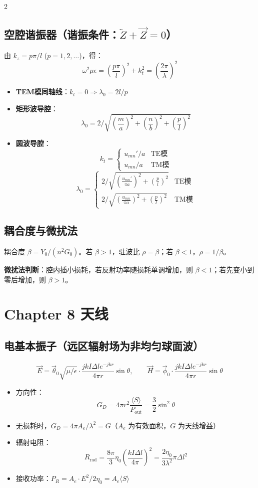 \documentclass[10pt,a4paper,landscape]{article}
\begin{document}
\begin{multicols}{2}
\subsection{空腔谐振器（谐振条件：$\overleftarrow{Z} + \overrightarrow{Z} = 0$）}
由 $k_z = p\pi/l$ ($p=1,2,\dots$)，得：
\[
\omega^2\mu\epsilon = \left(\frac{p\pi}{l}\right)^2 + k_t^2 = \left(\frac{2\pi}{\lambda}\right)^2
\]
\begin{itemize}
    \item \textbf{TEM模同轴线}：$k_t = 0 \Rightarrow \lambda_0 = 2l/p$
    \item \textbf{矩形波导腔}：
    \[
    \lambda_0 = 2 / \sqrt{\left(\frac{m}{a}\right)^2 + \left(\frac{n}{b}\right)^2 + \left(\frac{p}{l}\right)^2}
    \]
    \item \textbf{圆波导腔}：
    \[
    k_t = \begin{cases}
    u_{mn}'/a & \text{TE模} \\
    u_{mn}/a & \text{TM模}
    \end{cases}
    \]
    \[
    \lambda_0 = \begin{cases}
    2 / \sqrt{\left(\frac{u_{mn}'}{\pi a}\right)^2 + \left(\frac{p}{l}\right)^2} & \text{TE模} \\
    2 / \sqrt{\left(\frac{u_{mn}}{\pi a}\right)^2 + \left(\frac{p}{l}\right)^2} & \text{TM模}
    \end{cases}
    \]
\end{itemize}

\subsection{耦合度与微扰法}
耦合度 $\beta = Y_0/(n^2 G_0)$。若 $\beta>1$，驻波比 $\rho=\beta$；若 $\beta<1$，$\rho=1/\beta$。

\textbf{微扰法判断}：腔内插小损耗，若反射功率随损耗单调增加，则 $\beta<1$；若先变小到零后增加，则 $\beta>1$。

\section{Chapter 8 天线}
\subsection{电基本振子（远区辐射场为非均匀球面波）}
\[
\vec{E} = \vec{\theta}_0 \sqrt{\mu/\epsilon}\cdot \frac{jkI\Delta l e^{-jkr}}{4\pi r}\sin\theta, \qquad
\vec{H} = \vec{\phi}_0\cdot \frac{jkI\Delta l e^{-jkr}}{4\pi r}\sin\theta
\]
\begin{itemize}
    \item 方向性：
    \[
    G_D = 4\pi r^2 \frac{\langle S\rangle}{P_{\text{out}}} = \frac{3}{2}\sin^2\theta
    \]
    \item 无损耗时，$G_D = 4\pi A_e/\lambda^2 = G$（$A_e$ 为有效面积，$G$ 为天线增益）
    \item 辐射电阻：
    \[
    R_{\text{rad}} = \frac{8\pi}{3}\eta_0\left(\frac{kI\Delta l}{4\pi}\right)^2 = \frac{2\eta_0}{3\lambda^2}\pi\Delta l^2
    \]
    \item 接收功率：$P_R = A_e\cdot E^2/2\eta_0 = A_e\langle S\rangle$
\end{itemize}


\end{multicols}
\end{document}
